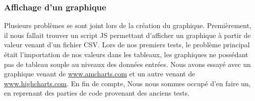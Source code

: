 \documentclass[12pt]{article}
\begin{document}
\subsubsection{Affichage d'un graphique}
Plusieurs problèmes se sont joint lors de la création du graphique. Premièrement, il nous fallait trouver un script JS permettant d’afficher un graphique à partir de valeur venant d’un fichier CSV. Lors de nos premiers tests, le problème principal était l’importation de nos valeurs dans les tableaux, les graphiques ne possédant pas de tableau souple au niveaux des données entrées. Nous avons essayé avec un graphique venant de \url{www.amcharts.com} et un autre venant de \url{www.highcharts.com}. En fin de compte, Nous nous sommes occupé d’en faire un, en reprenant des parties de code provenant des anciens tests. 

\clearpage

\listoffigures
\end{document}
